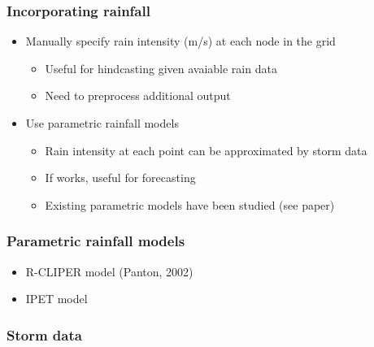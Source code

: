 \documentclass[10pt]{beamer}
\begin{document}
\begin{frame}
  \frametitle{Incorporating rainfall}
  \begin{itemize}
  \item Manually specify rain intensity (m/s) at each node in the grid
    \begin{itemize}
    \item Useful for hindcasting given avaiable rain data
    \item Need to preprocess additional output
    \end{itemize}
  \item Use parametric rainfall models
    \begin{itemize}
    \item Rain intensity at each point can be approximated by storm data
    \item If works, useful for forecasting
    \item Existing parametric models have been studied (see paper)
    \end{itemize}
  \end{itemize}
\end{frame}
\begin{frame}
  \frametitle{Parametric rainfall models}
  \begin{itemize}
  \item R-CLIPER model (Panton, 2002)
  \item IPET model
  \end{itemize}
\end{frame}

\begin{frame}
  \frametitle{Storm data}
\end{frame}
\end{document}
